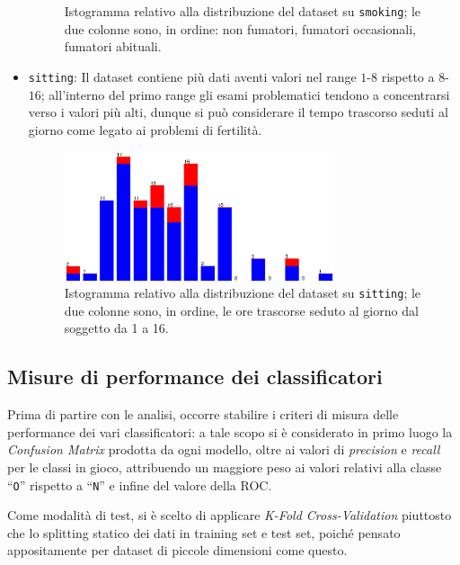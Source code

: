 \begin{itemize}
\begin{figure}[H]
      \caption{%
        Istogramma relativo alla distribuzione del dataset su \texttt{smoking};
        le due colonne sono, in ordine: non fumatori, fumatori occasionali, fumatori abituali.
      }%
      \label{fig:smoke}
    \end{figure}
  \item \texttt{sitting}:
    Il dataset contiene più dati aventi valori nel range \(1\)-\(8\) rispetto a \(8\)-\(16\);
    all'interno del primo range gli esami problematici tendono a concentrarsi verso i valori più alti, dunque si può considerare il tempo trascorso seduti al giorno come legato ai problemi di fertilità.
    \begin{figure}[H]
      \centering
      \includegraphics[width=0.75\textwidth]{fig/sit-discrete.eps}%
      \caption{%
        Istogramma relativo alla distribuzione del dataset su \texttt{sitting};
        le due colonne sono, in ordine, le ore trascorse seduto al giorno dal soggetto da 1 a 16.
      }%
      \label{fig:sit}
    \end{figure}
\end{itemize}

\subsection{Misure di performance dei classificatori}

Prima di partire con le analisi, occorre stabilire i criteri di misura delle performance dei vari classificatori:
a tale scopo si è considerato in primo luogo la \emph{Confusion Matrix} prodotta da ogni modello, oltre ai valori di \emph{precision} e \emph{recall} per le classi in gioco, attribuendo un maggiore peso ai valori relativi alla classe ``\texttt{O}'' rispetto a ``\texttt{N}'' e infine del valore della \emph{}{ROC}\@.

Come modalità di test, si è scelto di applicare \emph{K-Fold Cross-Validation} piuttosto che lo splitting statico dei dati in training set e test set, poiché pensato appositamente per dataset di piccole dimensioni come questo.

